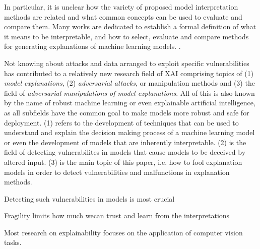 



In particular, it is unclear how the variety of proposed model interpretation methods are related and what common concepts can be used to evaluate and compare them. 
Many works are dedicated to establish a formal definition of what it means to be interpretable, and how to select, evaluate and compare methods for generating explanations of machine learning models. \cite{murdoch2019definitions, lipton2018mythos}.



Not knowing about attacks and data arranged to exploit specific vulnerabilities has contributed to a relatively new research field of XAI comprising topics of (1) \textit{model explanations}, (2) \textit{adversarial attacks}, or manipulation methods and (3) the field of \textit{adversarial manipulations of model explanations}. All of this is also known by the name of robust machine learning or even explainable artificial intelligence, as all subfields have the common goal to make models more robust and safe for deployment. 
(1) refers to the development of techniques that can be used to understand and explain the decision making process of a machine learning model or even the development of models that are inherently interpretable. (2) is the field of detecting vulnerabilites in models that cause models to be deceived by altered input. 
(3) is the main topic of this paper, i.e. how to fool explanation models in order to detect vulnerabilities and malfunctions in explanation methods. 

Detecting such vulnerabilities in models is most crucial 

Fragility limits how much wecan trust and learn from the interpretations



Most research on explainability focuses on the application of computer vision tasks. 

